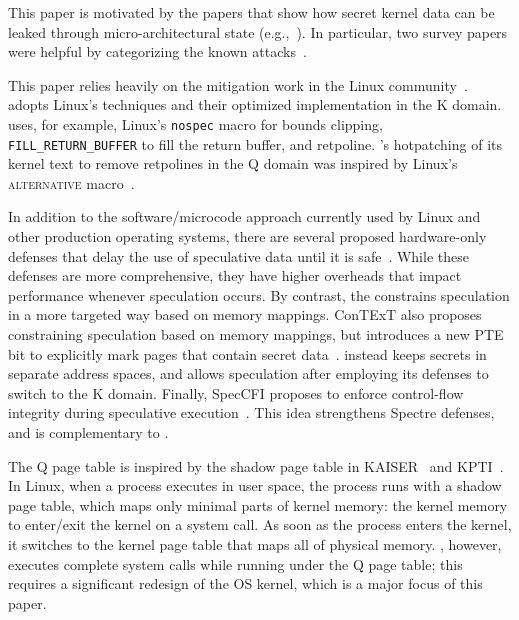 
This paper is motivated by the papers that show how secret kernel data
can be leaked through micro-architectural state
(e.g.,~\cite{lipp:meltdown, kocher:spectre, bulck:foreshadow,
  schaik:ridl,canella:fallout,schwarz:zombieload}).  In particular,
two survey papers were helpful by categorizing the known
attacks~\cite{hill:survey,sok:transient}.

This paper relies heavily on the mitigation work in the Linux
community~\cite{linux:vuln}. \sys adopts Linux's techniques and their
optimized implementation in the K domain.  \sys uses, for example,
Linux's \texttt{nospec} macro for bounds clipping,
\texttt{FILL\_RETURN\_BUFFER} to fill the return buffer, and retpoline.
\sys's hotpatching of its kernel text to remove retpolines in the Q
domain was inspired by Linux's \textsc{alternative}
macro~\cite{lwn:alternative}.

In addition to the software/microcode approach currently used by Linux
and other production operating systems, there are several proposed
hardware-only defenses that delay the use of speculative data until
it is safe~\cite{barber:specshield, weisse:nda, yu:stt}. While these defenses are
more comprehensive, they have higher overheads that impact performance whenever
speculation occurs. By contrast, the \contract constrains speculation in a more
targeted way based on memory mappings. ConTExT also proposes constraining
speculation based on memory mappings, but introduces a new PTE bit to explicitly
mark pages that contain secret data~\cite{ConTExT}. \sys instead keeps secrets in
separate address spaces, and allows speculation after employing its defenses to
switch to the K domain.  Finally, SpecCFI proposes to enforce control-flow
integrity during speculative execution~\cite{koruyeh:speccfi}. This idea strengthens
Spectre defenses, and is complementary to \sys. 

The Q page table is inspired by the shadow page table in
KAISER~\cite{gruss:kaiser} and KPTI~\cite{linux:kpti}. In Linux, when
a process executes in user space, the process runs with a shadow
page table, which maps only minimal parts of kernel memory: the kernel
memory to enter/exit the kernel on a system call. As soon as the process
enters the kernel, it switches to the kernel page table that maps all
of physical memory.  \sys, however, executes complete system
calls while running under the Q page table; this requires a significant
redesign of the OS kernel, which is a major focus of this paper.

